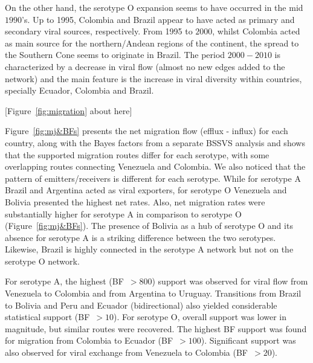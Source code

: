 \documentclass[10pt]{article}
\begin{document}
On the other hand, the serotype O expansion seems to have occurred in the mid $1990$'s.
Up to 1995, Colombia and Brazil appear to have acted as primary and secondary viral sources, respectively.
From 1995 to $2000$, whilst Colombia acted as main source for the northern/Andean regions of the continent, the spread to the Southern Cone seems to originate in Brazil.
The period $2000-2010$ is characterized by a decrease in viral flow (almost no new edges added to the network) and the main feature is the increase in viral diversity within countries, specially Ecuador, Colombia and Brazil.

\begin{center}
 [Figure~\ref{fig:migration} about here]
\end{center}

Figure~\ref{fig:mj&BFs} presents the net migration flow (efflux - influx) for each country, along with the Bayes factors from a separate BSSVS analysis and shows that the supported migration routes differ for each serotype, with some overlapping routes connecting Venezuela and Colombia. 
We also noticed that the pattern of emitters/receivers is different for each serotype.
While for serotype A Brazil and Argentina acted as viral exporters, for serotype O Venezuela and Bolivia presented the highest net rates.
Also, net migration rates were substantially higher for serotype A in comparison to serotype O (Figure~\ref{fig:mj&BFs}).
The presence of Bolivia as a hub of serotype O and its absence for serotype A is a striking difference between the two serotypes.
Likewise, Brazil is highly connected in the serotype A network but not on the serotype O network.

For serotype A, the highest (BF~$>800$) support was observed for viral flow from Venezuela to Colombia and from Argentina to Uruguay.
Transitions from Brazil to Bolivia and Peru and Ecuador (bidirectional) also yielded considerable statistical support (BF~$>10$). 
For serotype O, overall support was lower in magnitude, but similar routes were recovered.
The highest BF support was found for migration from Colombia to Ecuador (BF~$>100$).
Significant support was also observed for viral exchange from  Venezuela to Colombia (BF~$>20$). 
\end{document}
